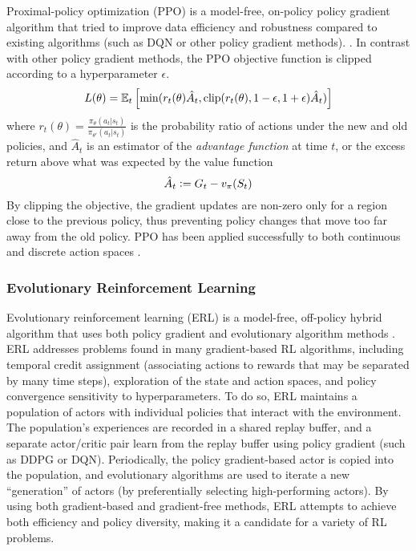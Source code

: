 Proximal-policy optimization (PPO) is a model-free, on-policy policy gradient algorithm that tried to improve data efficiency and robustness compared to existing algorithms (such as DQN or other policy gradient methods).
\cite{schulman2017proximal}.
In contrast with other policy gradient methods, the PPO objective function is clipped according to a hyperparameter $\epsilon$.
\begin{equation}\label{eq:ppo_loss}
    L(\theta) = \mathbb E_t \left[\min(
        r_t(\theta)\hat{A}_t,
        \text{clip}(r_t(\theta), 1-\epsilon, 1+\epsilon) \hat{A}_t
    )\right]
\end{equation}
where
$r_t(\theta) = \frac{\pi_\theta(a_t|s_t)}{\pi_{\theta'}(a_t|s_t)}$ is the probability ratio of actions under the new and old policies, and $\hat{A}_t$ is an estimator of the \emph{advantage function} at time $t$, or the excess return above what was expected by the value function
\[
\hat{A}_t \mathrel{\mathop:}= G_t - v_\pi(S_t)
\]
By clipping the objective, the gradient updates are non-zero only for a region close to the previous policy, thus preventing policy changes that move too far away from the old policy.
PPO has been applied successfully to both continuous and discrete action spaces%
.

\subsubsection{Evolutionary Reinforcement Learning}

Evolutionary reinforcement learning (ERL) is a model-free, off-policy hybrid algorithm that uses both policy gradient and evolutionary algorithm methods \cite{khadka2018evolutionguided}. ERL addresses problems found in many  gradient-based RL algorithms, including temporal credit assignment (associating actions to rewards that may be separated by many time steps), exploration of the state and action spaces, and policy convergence sensitivity to hyperparameters. To do so, ERL maintains a population of actors with individual policies that interact with the environment. The population's experiences are recorded in a shared replay buffer, and a separate actor/critic pair learn from the replay buffer using policy gradient (such as DDPG or DQN). Periodically, the policy gradient-based actor is copied into the population, and evolutionary algorithms are used to iterate a new ``generation'' of actors (by preferentially selecting high-performing actors). By using both gradient-based and gradient-free methods, ERL attempts to achieve both efficiency and policy diversity, making it a candidate for a variety of RL problems.

